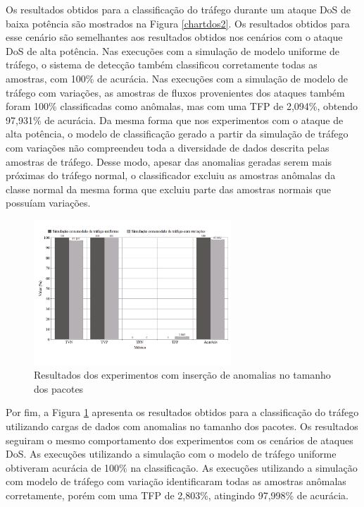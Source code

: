\documentclass[12pt]{article}
\begin{document}
Os resultados obtidos para a classificação do tráfego durante um ataque DoS de baixa potência são mostrados na Figura \ref{chartdos2}. Os resultados obtidos para esse cenário são semelhantes aos resultados obtidos nos cenários com o ataque DoS de alta potência. Nas execuções com a simulação de modelo uniforme de tráfego, o sistema de detecção também classificou corretamente todas as amostras, com 100\% de acurácia. Nas execuções com a simulação de modelo de tráfego com variações, as amostras de fluxos provenientes dos ataques também foram 100\% classificadas como anômalas, mas com uma TFP de 2,094\%, obtendo 97,931\% de acurácia. Da mesma forma que nos experimentos com o ataque de alta potência, o modelo de classificação gerado a partir da simulação de tráfego com variações não compreendeu toda a diversidade de dados descrita pelas amostras de tráfego. Desse modo, apesar das anomalias geradas serem mais próximas do tráfego normal, o classificador excluiu as amostras anômalas da classe normal da mesma forma que excluiu parte das amostras normais que possuíam variações.

\begin{figure}[h]
   \caption{Resultados dos experimentos com inserção de anomalias no tamanho dos pacotes}
   \begin{center}
       \includegraphics[width=20em]{chartsize}
   \end{center}
   \label{chartsize}
\end{figure}

Por fim, a Figura \ref{chartsize} apresenta os resultados obtidos para a classificação do tráfego utilizando cargas de dados com anomalias no tamanho dos pacotes. Os resultados seguiram o mesmo comportamento dos experimentos com os cenários de ataques DoS. As execuções utilizando a simulação com o modelo de tráfego uniforme obtiveram acurácia de 100\% na classificação. As execuções utilizando a simulação com modelo de tráfego com variação identificaram todas as amostras anômalas corretamente, porém com uma TFP de 2,803\%, atingindo 97,998\% de acurácia.
\end{document}

